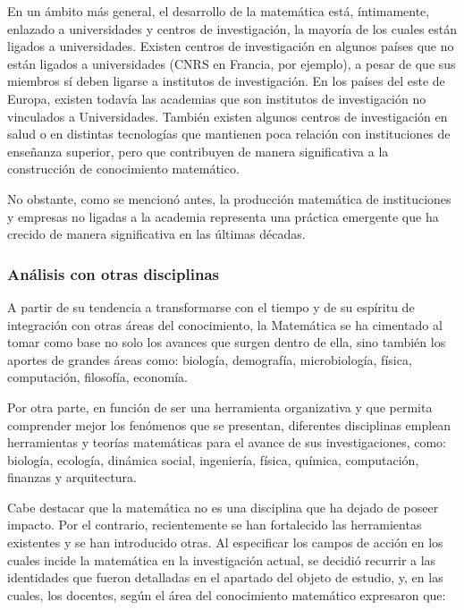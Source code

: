 En un ámbito más general, el desarrollo de la matemática está, íntimamente, enlazado a universidades y centros de investigación, la mayoría de los cuales están ligados a universidades. Existen centros de investigación en algunos países que no están ligados a universidades (CNRS en Francia, por ejemplo), a pesar de que sus miembros sí deben ligarse a institutos de investigación. En los países del este de Europa, existen todavía las academias que son institutos de investigación no vinculados a Universidades. También existen algunos centros de investigación en salud o en distintas tecnologías que mantienen poca relación con instituciones de enseñanza superior, pero que contribuyen de manera significativa a la construcción de conocimiento matemático. 

No obstante, como se mencionó antes, la producción matemática de instituciones y empresas no ligadas a la academia representa una práctica emergente que ha crecido de manera significativa en las últimas décadas. 

\subsubsection{Análisis con otras disciplinas}

A partir de su tendencia a transformarse con el tiempo y de su espíritu de integración con otras áreas del conocimiento, la Matemática se ha cimentado al tomar como base no solo los avances que surgen dentro de ella, sino también los aportes de grandes áreas como: biología, demografía, microbiología, física, computación, filosofía, economía. 

Por otra parte, en función de ser una herramienta organizativa y que permita comprender mejor los fenómenos que se presentan, diferentes disciplinas emplean herramientas y teorías matemáticas para el avance de sus investigaciones, como: biología, ecología, dinámica social, ingeniería, física, química, computación, finanzas y arquitectura. 

Cabe destacar que la matemática no es una disciplina que ha dejado de poseer impacto. Por el contrario, recientemente se han fortalecido las herramientas existentes y se han introducido otras. Al especificar los campos de acción en los cuales incide la matemática en la investigación actual, se decidió recurrir a las identidades que fueron detalladas en el apartado del objeto de estudio, y, en las cuales, los docentes, según el área del conocimiento matemático expresaron que:

